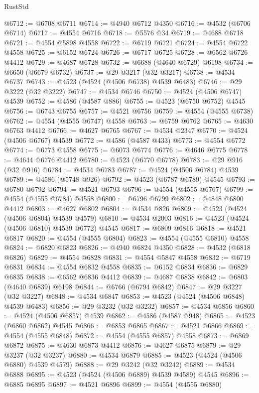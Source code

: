 \begin{lexlean}{RustStd}
\begin{coremodule}
@6712 := @6708 @6711
@6714 := @4940 @6712 @4350
@6716 := @4532 (@6706 @6714)
@6717 := @4554 @6716
@6718 := @5576 @34
@6719 := @4688 @6718
@6721 := @4554 @5898 @4558
@6722 := @6719 @6721
@6724 := @4554 @6722 @4558
@6725 := @6152 @6724
@6726 := @6717 @6725
@6728 := @6562 @6726 @4412
@6729 := @4687 @6728
@6732 := @6688 (@4640 @6729) @6198
@6734 := @6650 (@6679 @6732)
@6737 := @29 @3217 (@32 @3217)
@6738 := @4534 @6737
@6743 := @4523 (@4524 (@4506 @6738) @4539 @6483)
@6746 := @29 @3222 (@32 @3222)
@6747 := @4534 @6746
@6750 := @4524 (@4506 @6747) @4539
@6752 := @4586 (@4587 @886)
@6755 := @4523 (@6750 @6752) @4545
@6756 := @6743 @6755
@6757 := @4521 @6756
@6759 := @4554 (@4555 @6738)
@6762 := @4554 (@4555 @6747) @4558
@6763 := @6759 @6762
@6765 := @4630 @6763 @4412
@6766 := @4627 @6765
@6767 := @4534 @2347
@6770 := @4524 (@4506 @6767) @4539
@6772 := @4586 (@4587 @433)
@6773 := @4554 @6772
@6774 := @6773 @4558
@6775 := @6073 @6774
@6776 := @4646 @6775
@6778 := @4644 @6776 @4412
@6780 := @4523 (@6770 @6778)
@6783 := @29 @916 (@32 @916)
@6784 := @4534 @6783
@6787 := @4524 (@4506 @6784) @4539
@6789 := @4586 (@5748 @926)
@6792 := @4523 (@6787 @6789) @4545
@6793 := @6780 @6792
@6794 := @4521 @6793
@6796 := @4554 (@4555 @6767)
@6799 := @4554 (@4555 @6784) @4558
@6800 := @6796 @6799
@6802 := @4848 @6800 @4412
@6803 := @4627 @6802
@6804 := @4534 @826
@6809 := @4523 (@4524 (@4506 @6804) @4539 @4579)
@6810 := @4534 @2003
@6816 := @4523 (@4524 (@4506 @6810) @4539 @6772) @4545
@6817 := @6809 @6816
@6818 := @4521 @6817
@6820 := @4554 (@4555 @6804)
@6823 := @4554 (@4555 @6810) @4558
@6824 := @6820 @6823
@6826 := @4940 @6824 @4350
@6828 := @4532 (@6818 @6826)
@6829 := @4554 @6828
@6831 := @4554 @5847 @4558
@6832 := @6719 @6831
@6834 := @4554 @6832 @4558
@6835 := @6152 @6834
@6836 := @6829 @6835
@6838 := @6562 @6836 @4412
@6839 := @4687 @6838
@6842 := @6803 (@4640 @6839) @6198
@6844 := @6766 (@6794 @6842)
@6847 := @29 @3227 (@32 @3227)
@6848 := @4534 @6847
@6853 := @4523 (@4524 (@4506 @6848) @4539 @6483)
@6856 := @29 @3232 (@32 @3232)
@6857 := @4534 @6856
@6860 := @4524 (@4506 @6857) @4539
@6862 := @4586 (@4587 @948)
@6865 := @4523 (@6860 @6862) @4545
@6866 := @6853 @6865
@6867 := @4521 @6866
@6869 := @4554 (@4555 @6848)
@6872 := @4554 (@4555 @6857) @4558
@6873 := @6869 @6872
@6875 := @4630 @6873 @4412
@6876 := @4627 @6875
@6879 := @29 @3237 (@32 @3237)
@6880 := @4534 @6879
@6885 := @4523 (@4524 (@4506 @6880) @4539 @4579)
@6888 := @29 @3242 (@32 @3242)
@6889 := @4534 @6888
@6895 := @4523 (@4524 (@4506 @6889) @4539 @4589) @4545
@6896 := @6885 @6895
@6897 := @4521 @6896
@6899 := @4554 (@4555 @6880)

\end{coremodule}
\end{lexlean}
